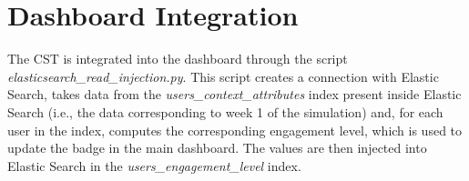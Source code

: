 \section{Dashboard Integration}
The CST is integrated into the dashboard through the script \textit{elasticsearch\_read\_injection.py}. 
This script creates a connection with Elastic Search, takes data from the 
\textit{users\_context\_attributes} index present inside Elastic Search (i.e., the data corresponding 
to week 1 of the simulation) and, for each user in the index, computes the corresponding engagement level, 
which is used to update the badge in the main dashboard. The values are then injected into Elastic Search 
in the \textit{users\_engagement\_level} index.